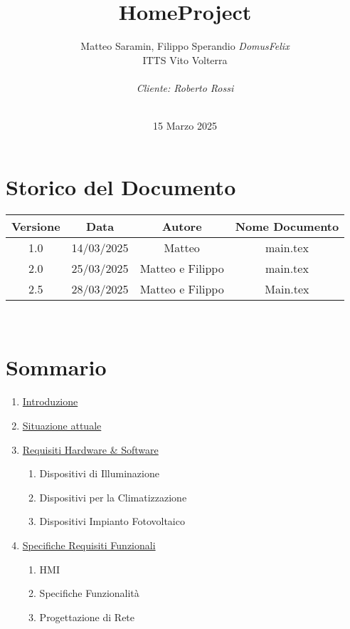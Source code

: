 \documentclass[italian, 12pt, a4paper]{article}
\title{\huge{HomeProject}}
\author{Matteo Saramin, Filippo Sperandio \textit{DomusFelix} \\ {\small ITTS Vito Volterra} \\ \\ \emph{Cliente: Roberto Rossi}}
\date{\version\\ 15 Marzo 2025}
\begin{document}
\maketitle %

\section{Storico del Documento}

\begin{center}
    \renewcommand{\arraystretch}{1.5} %
    \begin{tabular}{|c|c|c|c|}
        \hline
        \rowcolor{violet!30}
        Versione & Data & Autore & Nome Documento \\
        \hline
        1.0 & 14/03/2025 & Matteo & main.tex \\
        \hline
        2.0&25/03/2025&Matteo e Filippo & main.tex \\
        \hline
        2.5&28/03/2025&Matteo e Filippo&Main.tex\\
        \hline
    \end{tabular}\\[4mm]
\end{center}
\vspace{15mm}
\clearpage
\section{Sommario}
\begin{enumerate}
    \item \hyperref[sec:introduzione]{\Large Introduzione}
    \item \hyperref[sec:situazione]{\Large Situazione attuale}
    \item \hyperref[sec:requisiti]{\Large Requisiti Hardware \& Software}
        \begin{enumerate}
            \item Dispositivi di Illuminazione
            \item Dispositivi per la Climatizzazione
            \item Dispositivi Impianto Fotovoltaico
        \end{enumerate}
    \item \hyperref[sec:requisiti2]{\Large Specifiche Requisiti Funzionali}
        \begin{enumerate}
            \item HMI
            \item Specifiche Funzionalità
            \item Progettazione di Rete
        \end{enumerate}
\end{enumerate}
\clearpage
\end{document}
